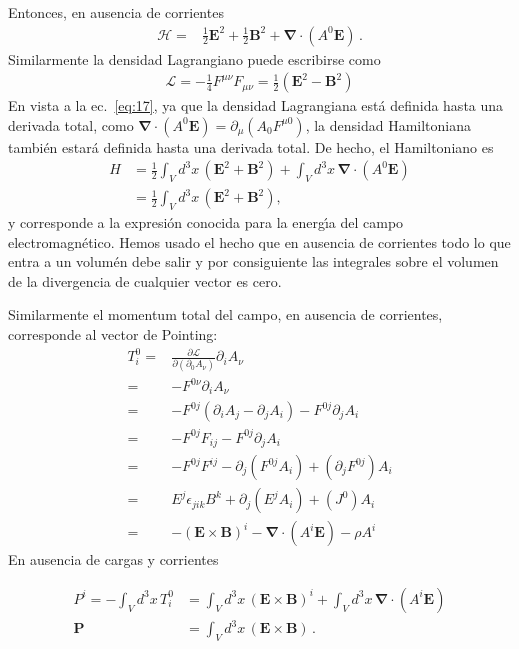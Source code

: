 \begin{frame}
Entonces, en ausencia de corrientes
\begin{align}
  \mathcal{H}=&\frac{1}{2}\mathbf{E}^2+\frac{1}{2}\mathbf{B}^2+\boldsymbol{\nabla}\cdot(A^0\mathbf{E})\,.
\end{align}
Similarmente la densidad Lagrangiano puede escribirse como
\begin{align}
   \mathcal{L}=-\frac{1}{4}F^{\mu\nu}F_{\mu\nu}=\frac{1}{2}\left(\mathbf{E}^2-\mathbf{B}^2\right)
\end{align}
En vista a la ec.~\eqref{eq:17}, ya que la densidad Lagrangiana est\'a definida hasta una derivada total, como $\boldsymbol{\nabla}\cdot(A^0\mathbf{E})=\partial_\mu(A_0F^{\mu0})$, la densidad Hamiltoniana tambi\'en estar\'a definida hasta una derivada total. De hecho,
el Hamiltoniano es 
\begin{align}
  H&=\frac{1}{2}\int_Vd^3x\,(\mathbf{E}^2+\mathbf{B}^2)+ \int_Vd^3x\,\boldsymbol{\nabla}\cdot(A^0\mathbf{E})\nonumber\\
  \label{eq:18}
  &=\frac{1}{2}\int_Vd^3x\,(\mathbf{E}^2+\mathbf{B}^2),
\end{align}
y corresponde a la expresi\'on conocida para la energ\'\i a del campo electromagn\'etico. Hemos usado el hecho que en ausencia de corrientes todo lo que entra a un volum\'en debe salir y por consiguiente las integrales sobre el volumen de la divergencia de cualquier vector es cero.

Similarmente el momentum total del
campo, en ausencia de corrientes, corresponde al vector de Pointing:
\begin{align}
  T^0_i=&\frac{\partial\mathcal{L}}{\partial(\partial_0 A_\nu)}\partial_i A_\nu\nonumber\\
  =&-F^{0\nu}\partial_i A_\nu\nonumber\\
  =&-F^{0j}(\partial_i A_j-\partial_j A_i)-F^{0j}\partial_j A_i\nonumber\\
  =&-F^{0j}F_{ij}-F^{0j}\partial_j A_i\nonumber\\
  =&-F^{0j}F^{ij}-\partial_j (F^{0j}A_i)+(\partial_jF^{0j}) A_i\nonumber\\
  =&E^{j}\epsilon_{jik}B^k+\partial_j (E^jA_i)+(J^0) A_i\nonumber\\
  =&-(\mathbf{E}\times\mathbf{B})^i-\boldsymbol{\nabla}\cdot(A^i\mathbf{E})-\rho A^i\,
\end{align}
En ausencia de cargas y corrientes

\begin{align}
 P^i=-\int_Vd^3x\,T_{i}^0&=\int_Vd^3x\,(\mathbf{E}\times\mathbf{B})^i+\int_Vd^3x\,\boldsymbol{\nabla}\cdot(A^i\mathbf{E})\nonumber\\
 \label{eq:19}
 \mathbf{P}&=\int_Vd^3x\,(\mathbf{E}\times\mathbf{B})\,.
\end{align}
\end{frame}
